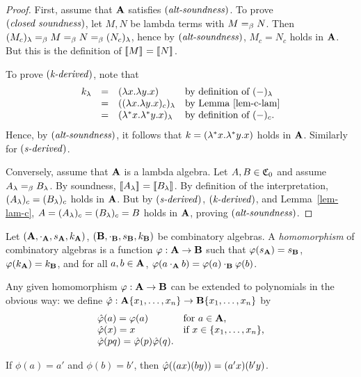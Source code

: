 \documentclass{article}
\begin{document}
\begin{proof}
  First, assume that ${\bf A}$ satisfies $\textrm{(\textit{alt-soundness\/})}$. To prove
  $\textrm{(\textit{closed soundness\/})}$, let $M,N$ be lambda terms with $M=_{\beta}
  N$. Then $(M_c)_\lambda =_{\beta} M=_{\beta} N=_{\beta} (N_c)_\lambda$, hence by
  $\textrm{(\textit{alt-soundness\/})}$, $M_c=N_c$ holds in ${\bf A}$. But this is the
  definition of $[\![M]\!]_{}=[\![N]\!]_{}$. 
  
  To prove $\textrm{(\textit{k-derived\/})}$, note that 
  \[\begin{array}{llll}
    k_\lambda &=& (\lambda x.\lambda y.x) &\mbox{by definition of $(-)_\lambda$} \\
    &=& ((\lambda x.\lambda y.x)_c)_\lambda &\mbox{by Lemma~\ref{lem-c-lam}}\\
    &=& (\lambda^* x.\lambda^* y.x)_\lambda &\mbox{by definition of $(-)_c$}.
  \end{array}
  \]
  Hence, by $\textrm{(\textit{alt-soundness\/})}$, it follows that $k=(\lambda^*
  x.\lambda^* y.x)$ holds in ${\bf A}$. Similarly for $\textrm{(\textit{s-derived\/})}$.
  
  Conversely, assume that ${\bf A}$ is a lambda algebra. Let
  $A,B\in{\mathfrak C}_0$ and assume $A_\lambda=_{\beta} B_\lambda$. By soundness,
  $[\![A_\lambda]\!]_{}=[\![B_\lambda]\!]_{}$. By definition of the interpretation,
  $(A_\lambda)_c=(B_\lambda)_c$ holds in ${\bf A}$. But by $\textrm{(\textit{s-derived\/})}$,
  $\textrm{(\textit{k-derived\/})}$, and Lemma~\ref{lem-lam-c},
  $A=(A_\lambda)_c=(B_\lambda)_c=B$ holds in ${\bf A}$, proving
  $\textrm{(\textit{alt-soundness\/})}$.\eot
\end{proof}

\begin{definition}[Homomorphism]
  Let $({\bf A},\cdot_{\bf A},s_{\bf A},k_{\bf A})$, $({\bf B},\cdot_{\bf B},s_{\bf B},k_{\bf B})$ be
  combinatory algebras.  A {\em homomorphism} of combinatory algebras
  is a function $\varphi:{\bf A}\to{\bf B}$ such that $\varphi(s_{\bf A})=s_{\bf B}$,
  $\varphi(k_{\bf A})=k_{\bf B}$, and for all $a,b\in{\bf A}$, $\varphi(a\cdot_{\bf A}
  b)=\varphi(a)\cdot_{\bf B} \varphi(b)$.
\end{definition}

Any given homomorphism $\varphi:{\bf A}\to{\bf B}$ can be extended to polynomials
in the obvious way: we define
$\hat{\varphi}:{\bf A}\{x_1,\ldots,x_n\}\to{\bf B}\{x_1,\ldots,x_n\}$ by
\[\begin{array}{ll}
  \hat{\varphi}(a)=\varphi(a) & \mbox{for $a\in{\bf A}$,}\\
  \hat{\varphi}(x)=x       & \mbox{if $x\in\{x_1,\ldots,x_n\}$,}\\
  \hat{\varphi}(pq)=\hat{\varphi}(p)\hat{\varphi}(q). \\
\end{array}
\]

\begin{example}
  If $\phi(a)=a'$ and $\phi(b)=b'$, then $\hat{\varphi}((ax)(by)) = (a'x)(b'y)$. 
\end{example}
\end{document}
